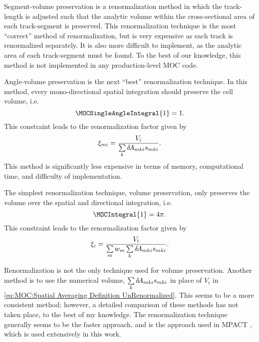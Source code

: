 {{{            Segment-volume preservation is a renormalization method in which the track-length is adjusted such that the analytic volume within the cross-sectional area of each track-segment is preserved.
            This renormalization technique is the most ``correct'' method of renormalization, but is very expensive as each track is renormalized separately.
            It is also more difficult to implement, as the analytic area of each track-segment must be found.
            To the best of our knowledge, this method is not implemented in any production-level \ac{MOC} code.

            Angle-volume preservation is the next ``best'' renormalization technique.
            In this method, every mono-directional spatial integration should preserve the cell volume, i.e.
            \begin{equation}\label{eq:MOC:Angle-Volume Preservation}
                \MOCSingleAngleIntegral{1} = 1.
            \end{equation}
            This constraint leads to the renormalization factor given by
            \begin{equation}\label{eq:MOC:Direction-Dependent Renormalization}
                \renorm[mi] = \frac{V_i}{\suml[k]\tA[mki]\segl}.
            \end{equation}
            This method is significantly less expensive in terms of memory, computational time, and difficulty of implementation.

            The simplest renormalization technique, volume preservation, only preserves the volume over the spatial and directional integration, i.e.
            \begin{equation}\label{eq:MOC:Volume Preservation}
                \MOCIntegral{1} = \fourpi.
            \end{equation}
            This constraint leads to the renormalization factor given by
            \begin{equation}\label{eq:MOC:Region Renormalization}
                \renorm[i] = \frac{V_i}{\suml[m]\wt[m]\suml[k]\tA[mki]\segl}.
            \end{equation}

            Renormalization is not the only technique used for volume preservation.
            Another method is to use the numerical volume, $\suml[k]\tA[mki]\segl$ in place of $V_i$ in \cref{eq:MOC:Spatial Averaging Definition UnRenormalized}.
            This seems to be a more consistent method; however, a detailed comparison of these methods has not taken place, to the best of my knowledge.
            The renormalization technique generally seems to be the faster approach, and is the approach used in MPACT \cite{Collins2016}, which is used extensively in this work.
        }
    }
}
